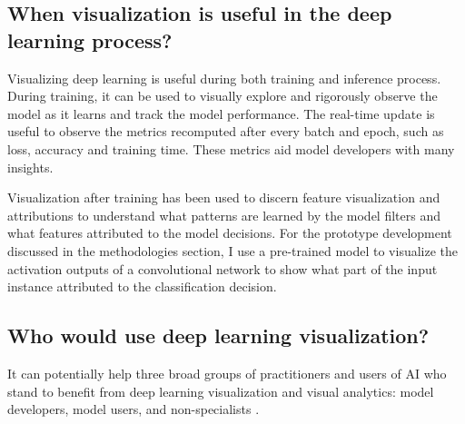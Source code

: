 \subsection*{When visualization is useful in the deep learning process?}

Visualizing deep learning is useful during both training and inference process. During training, it can be used to visually explore and rigorously observe the model as it learns and track the model performance. The real-time update is useful to observe the metrics recomputed after every batch and epoch, such as loss, accuracy and training time. These metrics aid model developers with many insights.

Visualization after training has been used to discern feature visualization \cite{featurevis} and attributions \cite{Olah2018} to understand what patterns are learned by the model filters and what features attributed to the model decisions. For the prototype development discussed in the methodologies section, I use a pre-trained model to visualize the activation outputs of a convolutional network to show what part of the input instance attributed to the classification decision.

\subsection*{Who would use deep learning visualization?}

It can potentially help three broad groups of practitioners and users of AI who stand to benefit from deep learning visualization and visual analytics: model developers, model users, and non-specialists \cite{Choo2018}.
